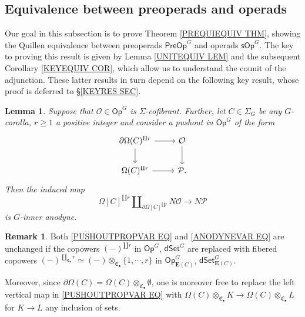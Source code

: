 \documentclass[a4paper,10pt]{article}%
\numberwithin{equation}{section}
\numberwithin{figure}{section}
\newtheorem{lemma}[equation]{Lemma}%
\theoremstyle{definition} %
\newtheorem{remark}[equation]{Remark}%
\newcommand{\1}{\ensuremath{\mathbbm 1}}%
\begin{document}
\subsection{Equivalence between preoperads and operads}
\label{PREOPOPEQUIV SEC}

Our goal in this subsection is to prove
Theorem \ref{PREQUIEQUIV THM},
showing the Quillen equivalence between
preoperads $\mathsf{PreOp}^G$
and operads $\mathsf{sOp}^G$.
The key to proving this result is given by 
Lemma \ref{UNITEQUIV LEM}
and the subsequent
Corollary \ref{KEYEQUIV COR},
which allow us to understand the counit of the adjunction.
These latter results in turn depend on the following key 
result, whose proof is deferred to \S \ref{KEYRES SEC}.


\begin{lemma}\label{KEYPRVAR LEM}
	Suppose that $\mathcal{O} \in \mathsf{Op}^{G}$
	is $\Sigma$-cofibrant.
	Further, let $C \in \Sigma_G$ be any $G$-corolla,
	$r \geq 1$ a positive integer and consider 
	a pushout in $\mathsf{Op}^{G}$ of the form
\begin{equation}\label{PUSHOUTPROPVAR EQ}
	\begin{tikzcd}
	\partial \Omega(C)^{\amalg r} \ar{r} \ar{d} 
	& \mathcal{O} \ar{d}
\\
	\Omega(C)^{\amalg r} \ar{r} & \mathcal{P}.
	\end{tikzcd}
\end{equation}
	Then the induced map
\begin{equation}\label{ANODYNEVAR EQ}
	\Omega[C]^{\amalg r} 
	\amalg_{\partial \Omega[C]^{\amalg r}} N\mathcal{O} \to N\mathcal{P}
\end{equation}
	is $G$-inner anodyne.
\end{lemma}

\begin{remark}\label{KEYPRVAR REM}
	Both \eqref{PUSHOUTPROPVAR EQ} and \eqref{ANODYNEVAR EQ}
	are unchanged if the copowers $(-)^{\amalg r}$ in 
	$\mathsf{Op}^G$, $\mathsf{dSet}^G$
	are replaced with fibered copowers 
	$(-)^{\amalg_{\mathfrak{C}_{\bullet}} r} \simeq 
	(-) \otimes_{\mathfrak{C}_{\bullet}} \{1,\cdots,r\}$
	in 
	$\mathsf{Op}^G_{\boldsymbol{E}(C)}$,
	$\mathsf{dSet}^G_{\boldsymbol{E}(C)}$.
	
	Moreover, since 
	$\partial \Omega(C) = \Omega(C) \otimes_{\mathfrak{C}_{\bullet}} \emptyset$,
	one is moreover free to replace
	the left vertical map in \eqref{PUSHOUTPROPVAR EQ}
	with 
	$\Omega(C) \otimes_{\mathfrak{C}_{\bullet}} K
	\to
	\Omega(C) \otimes_{\mathfrak{C}_{\bullet}} L$
	for $K\to L$ any inclusion of sets.
\end{remark}
\end{document}
